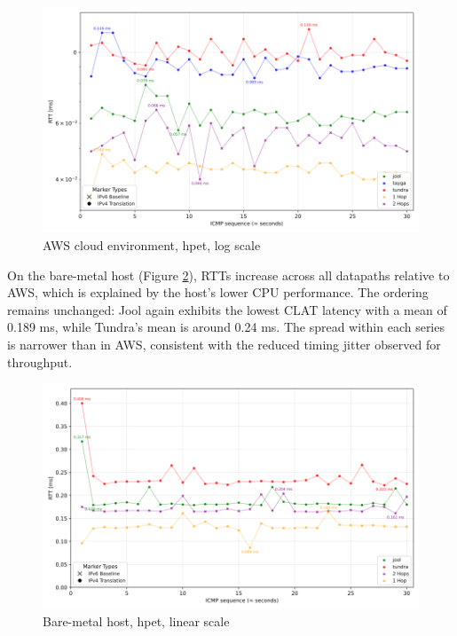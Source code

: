 \begin{figure}[H]
    \centering
    \includegraphics[width=1\textwidth]{resources/plots/CombinedPlot/RTT/AWS_ping_rtt_Ping_30s_log.png}
    \caption{AWS cloud environment, hpet, log scale}
    \label{fig:AWS_icmp_sameScale_hpet_log}

\end{figure}

On the bare-metal host (Figure \ref{fig:Local_icmp_sameScale_hpet_linear}), RTTs increase across all datapaths relative to AWS, which is explained by the host’s lower CPU performance. The ordering remains unchanged: Jool again exhibits the lowest CLAT latency with a mean of 0.189 ms, while Tundra’s mean is around 0.24 ms. The spread within each series is narrower than in AWS, consistent with the reduced timing jitter observed for throughput.

\begin{figure}[H]
    \centering
    \includegraphics[width=1\textwidth]{resources/plots/CombinedPlot/RTT/Single_ping_rtt_Ping_30s_linear.png}
    \caption{Bare-metal host, hpet, linear scale}
    \label{fig:Local_icmp_sameScale_hpet_linear}
\end{figure}

